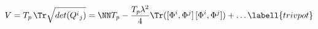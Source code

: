 \begin{equation}
V=T_p\,\Tr\sqrt{det(Q^i{}_j)}= \NN T_p-{T_p\lambda^2\over4}
\Tr([\Phi^i,\Phi^j]\,[\Phi^i,\Phi^j])+\ldots \labell{trivpot}
\end{equation}

